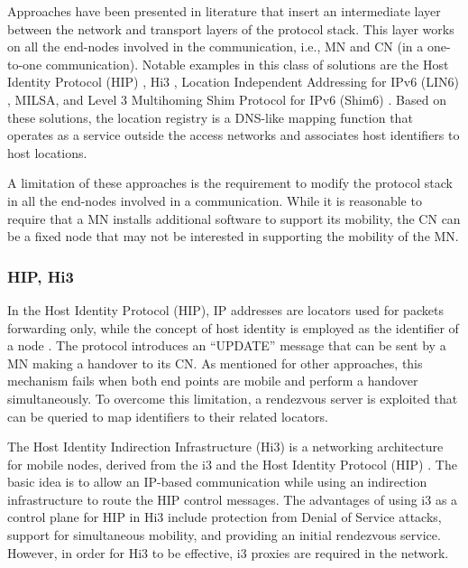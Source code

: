 \documentclass[preprint,12pt]{elsarticle}
\begin{document}
Approaches have been presented in literature that insert an intermediate 
layer between the network and transport layers of the protocol stack. This layer 
works on all the end-nodes involved in the communication, i.e., MN and CN (in a one-to-one 
communication). 
Notable examples in this class of solutions are the Host Identity Protocol (HIP) 
\cite{BokorZNJ09,rfc4423}, Hi3 \cite{GurtovKLN08}, Location Independent Addressing 
for IPv6 (LIN6) \cite{draft-teraoka-ipng,kunishi2000lin6}, MILSA, 
\cite{Pan:2010} and Level 3 Multihoming Shim Protocol for IPv6 (Shim6) 
\cite{rfc5533}. 
Based on these solutions, the location registry is a DNS-like mapping function 
that operates as a service outside the access networks and associates host 
identifiers to host locations. 

A limitation of these approaches is the requirement to modify the protocol stack in all the end-nodes involved in a communication. While it is reasonable to require that a MN installs additional software to support its mobility, the CN can be a fixed node that may not be interested in supporting the mobility of the MN.

\subsubsection{HIP, Hi3}
In the Host Identity Protocol (HIP), IP addresses are locators used for 
packets forwarding only, while the concept of host identity is employed as the 
identifier of a node \cite{BokorZNJ09,rfc4423}. The protocol introduces an 
``UPDATE'' message that can be sent by a MN making a handover to its CN. As 
mentioned for other approaches, this mechanism fails when both end points are 
mobile and perform a handover simultaneously. To overcome this limitation, a 
rendezvous server is exploited that can be queried to map identifiers to their 
related locators.

The Host Identity Indirection Infrastructure (Hi3) is a networking
architecture for mobile nodes, derived from the i3 and the Host Identity Protocol (HIP) \cite{GurtovKLN08,nikander2004host}. The basic idea is to allow an IP-based communication while using an indirection infrastructure to route the HIP control messages.
The advantages of using i3 as a control plane for HIP in Hi3 include protection from Denial of Service attacks, support for simultaneous mobility, and providing an initial rendezvous service.
However, in order for Hi3 to be effective, i3 proxies are required in the network.
\end{document}

